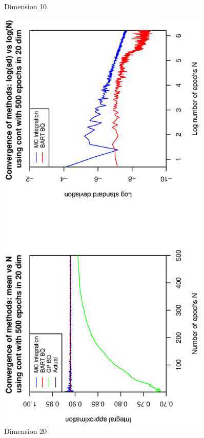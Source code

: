 \begin{figure}[H]
\begin{minipage}[b]{0.4\textwidth}
     \caption{\centering Dimension 10}
  \end{minipage}
    \hspace{1.5cm}
  \begin{minipage}[b]{0.4\textwidth}
    \includegraphics[width= 0.9\textwidth, angle = -90]{report/Figures/1/convergenceMean120Dimensions.eps}
     \vspace{-1.3cm}
    \caption{Dimension 20}
  \end{minipage}
\end{figure}


